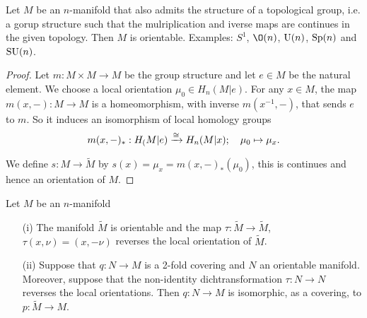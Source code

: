 \documentclass[a4paper,11pt,english]{article}
\def\tM{\widetilde{M}}
\begin{document}
\begin{exmp}
Let $M$ be an $n$-manifold that also admits the structure of a topological
group, i.e. a gorup structure such that the mulriplication and iverse maps are
continues in the given topology. Then $M$ is orientable. Examples: $S^1$,
$\O(n)$, $\operatorname{U}(n)$, $\operatorname{Sp}(n)$ and $\operatorname{SU}(n)$.
\end{exmp}

\begin{proof}
Let $m: M\times M \to M$ be the group structure and let $e\in M$ be the natural
element. We choose a local orientation $\mu_0 \in H_n(M|e)$. For any $x\in M$,
the map $m(x,-) : M \to M$ is a homeomorphism, with inverse $m(x^{-1}, -)$, that
sends $e$ to $m$. So it induces an isomorphism of local homology groups
\[ m(x, -)_* : H_(M|e) \xrightarrow{\cong} H_n(M|x); \quad \mu_0 \mapsto \mu_x. \]

We define $s:M\to \tM$ by $s(x) = \mu_x = m(x,-)_* (\mu_0)$, this is continues
and hence an orientation of $M$.
\end{proof}

\newcommand{\tx}{\tilde{x}}

\begin{prop}
Let $M$ be an $n$-manifold
\begin{enumerate}
\item[(i)] The manifold $\tM$ is orientable and the map $\tau : \tM \to \tM$,
$\tau(x,\nu) = (x,-\nu)$ reverses the local orientation of $\tM$.
\item[(ii)] Suppose that $q: N \to M$ is a 2-fold covering and $N$ an orientable
manifold. Moreover, suppose that the non-identity dichtransformation $\tau: N
\to N$ reverses the local orientations. Then $q: N \to M$ is isomorphic, as a
covering, to $p: \tM \to M$.
\end{enumerate}
\end{prop}
\end{document}
